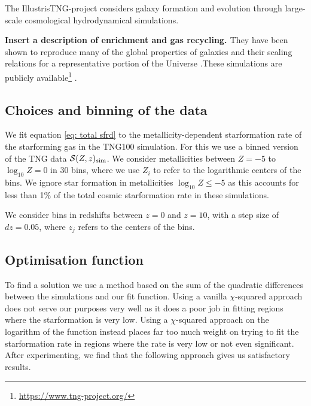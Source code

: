 \documentclass[twocolumn]{aastex631}
\newcommand{\SFRDzZ}{\ensuremath{\mathcal{S}(Z,z)}\xspace}
\newcommand{\SdM}[1]{{\color{pink}\bf{#1}}}
\begin{document}
The IllustrisTNG-project considers galaxy formation and evolution through large-scale cosmological hydrodynamical simulations.

\SdM{Insert a description of enrichment and gas recycling. }
They have been shown to reproduce many of the global properties of galaxies and their scaling relations for a representative portion of the Universe \citep[e.g.][]{FirstResTNG_Naiman2018,Torrey+2021,Genel+2018,Hemler+2021}.These simulations are publicly available\footnote{ \url{https://www.tng-project.org/}} \citep{FirstResTNG_Springel2018,FirstResTNG_Marinacci2018, FirstResTNG_Nelson2018,FirstResTNG_Pillepich2018, FirstResTNG_Naiman2018}.


\subsection{Choices and binning of the data}
We fit equation \ref{eq: total sfrd} to the metallicity-dependent starformation rate of the starforming gas in the TNG100 simulation. For this we use a binned version of the TNG data $\SFRDzZ_{\rm sim}$. We consider metallicities between $Z= -5$ to $\log_{10} Z= 0$ in 30 bins, where we use $Z_i$ to refer to the logarithmic centers of the bins. We ignore star formation in metallicities $\log_{10} Z \le -5$ as this accounts for less than 1\% of the total cosmic starformation rate in these simulations.  

We consider bins in redshifts between $z=0$ and $z=10$, with a step size of $dz=0.05$, where $z_j$ refers to the centers of the bins. 

\subsection{Optimisation function}
To find a solution we use a method based on the sum of the quadratic differences between the simulations and our fit function. Using a vanilla $\chi$-squared approach does not serve our purposes very well as it does a poor job in fitting regions where the starformation is very low.  Using a $\chi$-squared approach on the logarithm of the function instead places far too much weight on trying to fit the starformation rate in regions where the rate is very low or not even significant.  After experimenting, we find that the following approach gives us satisfactory results. 
\end{document}
